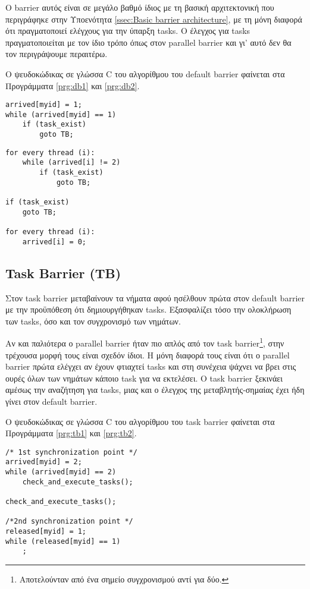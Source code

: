 Ο barrier αυτός είναι σε μεγάλο βαθμό ίδιος με τη βασική αρχιτεκτονική που περιγράφηκε στην Υποενότητα \ref{ssec:Basic barrier architecture}, με τη μόνη διαφορά ότι πραγματοποιεί ελέγχους για την ύπαρξη tasks. Ο έλεγχος για tasks πραγματοποιείται με τον ίδιο τρόπο όπως στον parallel barrier και γι' αυτό δεν θα τον περιγράψουμε περαιτέρω.

Ο ψευδοκώδικας σε γλώσσα C του αλγορίθμου του default barrier φαίνεται στα Προγράμματα \ref{prg:db1} και \ref{prg:db2}.

\begin{lstlisting}[label=prg:db1, caption=Default barrier για όλα τα νήματα πλην του νήματος-αρχηγού.]
arrived[myid] = 1;
while (arrived[myid] == 1)
    if (task_exist)
        goto TB;
\end{lstlisting}

\begin{lstlisting}[label=prg:db2, caption=Default barrier για το νήμα-αρχηγό.]
for every thread (i):
    while (arrived[i] != 2)
        if (task_exist)
            goto TB;

if (task_exist)
    goto TB;
     
for every thread (i):
    arrived[i] = 0;
\end{lstlisting}


\subsection{Task Barrier (TB)}
\label{ssec:tb}
Στον task barrier μεταβαίνουν τα νήματα αφού ησέλθουν πρώτα στον default barrier με την προϋπόθεση ότι δημιουργήθηκαν tasks. Εξασφαλίζει τόσο την ολοκλήρωση των tasks, όσο και τον συγχρονισμό των νημάτων.

Αν και παλιότερα ο parallel barrier ήταν πιο απλός από τον task barrier\footnote{Αποτελούνταν από ένα σημείο συγχρονισμού αντί για δύο.}, στην τρέχουσα μορφή τους είναι σχεδόν ίδιοι. Η μόνη διαφορά τους είναι ότι ο parallel barrier πρώτα ελέγχει αν έχουν φτιαχτεί tasks και στη συνέχεια ψάχνει να βρει στις ουρές όλων των νημάτων κάποιο task για να εκτελέσει. Ο task barrier ξεκινάει αμέσως την αναζήτηση για tasks, μιας και ο έλεγχος της μεταβλητής-σημαίας έχει ήδη γίνει στον default barrier.

Ο ψευδοκώδικας σε γλώσσα C του αλγορίθμου του task barrier φαίνεται στα Προγράμματα \ref{prg:tb1} και \ref{prg:tb2}.

\begin{lstlisting}[label=prg:tb1, caption=Task barrier για όλα τα νήματα πλην του νήματος-αρχηγού.]
/* 1st synchronization point */
arrived[myid] = 2;
while (arrived[myid] == 2)
    check_and_execute_tasks();
    
check_and_execute_tasks();
    
/*2nd synchronization point */
released[myid] = 1;
while (released[myid] == 1)
    ;
\end{lstlisting}

